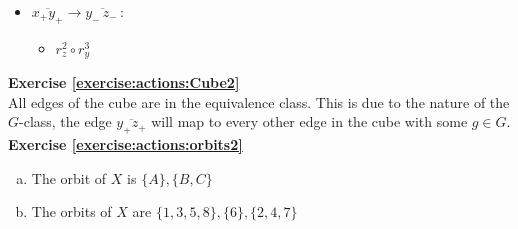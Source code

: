 \begin{enumerate}[(a)]
\begin{enumerate}[(i)]
\begin{multicols}{3}
\begin{itemize}
	 	\item
	 	$\overline{x_+y_+} \rightarrow \overline{y_-\,z_-\,}$: 
	 		\begin{itemize}
	 		\item
	 		$r_z^2 \circ r_y^3$
	 		\end{itemize}
	 		
	 	\end{itemize}
		\end{multicols}

\end {enumerate}
\end{enumerate}

\noindent\textbf{Exercise \ref{exercise:actions:Cube2}}
\\
All edges of the cube are in the equivalence class.  This is due to the nature of the $G$-class, the edge $\overline{y_+z_+}$ will map to every other edge in the cube with some $g \in G$.
\\

\noindent\textbf{Exercise \ref{exercise:actions:orbits2}}
\begin{enumerate}[(a)]
\item 
The orbit of $X$ is $\{A\}, \{B, C\}$

\item 
The orbits of $X$ are $\{1, 3, 5, 8\}, \{6\}, \{2, 4, 7\}$
\end{enumerate}

